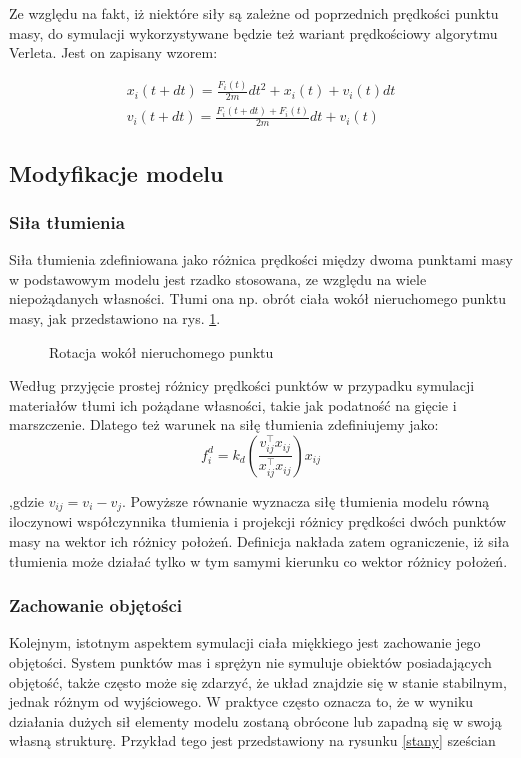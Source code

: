 Ze względu na fakt, iż niektóre siły są zależne od poprzednich prędkości punktu masy, do symulacji wykorzystywane będzie też wariant prędkościowy algorytmu Verleta. Jest on zapisany wzorem:

\begin{eqnarray}
x_i(t + dt) = \frac{F_i(t)}{2m} dt^2 + x_i(t) + v_i(t)dt \\
v_i(t + dt) = \frac{F_i(t + dt) + F_i(t)}{2m}dt + v_i(t)
\end{eqnarray}

%
%
\subsection{Modyfikacje modelu}

\subsubsection{Siła tłumienia}
Siła tłumienia zdefiniowana jako różnica prędkości między dwoma punktami masy w podstawowym modelu jest rzadko stosowana, ze względu na wiele niepożądanych własności. Tłumi ona np. obrót ciała wokół nieruchomego punktu masy, jak przedstawiono na rys. \ref{tlumienie}.

\begin{figure}[ht]
\centering

\caption{Rotacja wokół nieruchomego punktu}
\label{tlumienie}
\end{figure}

Według \cite{pbdo} przyjęcie prostej różnicy prędkości punktów w przypadku symulacji materiałów tłumi ich pożądane własności, takie jak podatność na gięcie i marszczenie. Dlatego też warunek na siłę tłumienia zdefiniujemy jako:
\begin{equation}
f^{d}_i = k_d (\frac{v_{ij}^\intercal x_{ij}}{x_{ij}^\intercal x_{ij}}) x_{ij}
\end{equation}

,gdzie $v_{ij} = v_i - v_j$. Powyższe równanie wyznacza siłę tłumienia modelu równą iloczynowi współczynnika tłumienia i projekcji różnicy prędkości dwóch punktów masy na wektor ich różnicy położeń. Definicja nakłada zatem ograniczenie, iż siła tłumienia może działać tylko w tym samymi kierunku co wektor różnicy położeń.

\subsubsection{Zachowanie objętości}
Kolejnym, istotnym aspektem symulacji ciała miękkiego jest zachowanie jego objętości. System punktów mas i sprężyn nie symuluje obiektów posiadających objętość, także często może się zdarzyć, że układ znajdzie się w stanie stabilnym, jednak różnym od wyjściowego. W praktyce często oznacza to, że w wyniku działania dużych sił elementy modelu zostaną obrócone lub zapadną się w swoją własną strukturę. Przykład tego jest przedstawiony na rysunku \ref{stany} sześcian 

